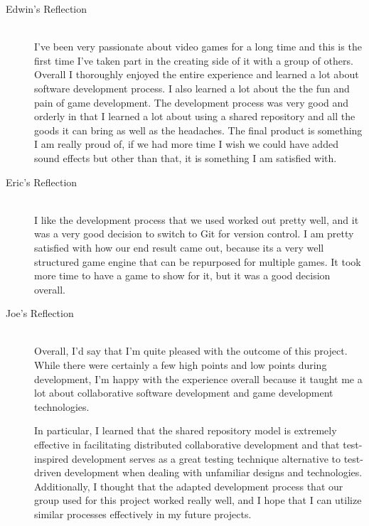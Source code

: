 \documentclass{article}
\begin{document}
\begin{description}
			\item[Edwin's Reflection] \hfill \\
			I've been very passionate about video games for a long time and this 
			is the first time I've taken part in the creating side of it with a group of
			others. Overall I thoroughly enjoyed the entire experience and learned a lot
			about software development process. I also learned a lot about the the fun
			and pain of game development. The development process was very good
			and orderly in that I learned a lot about using a shared repository and all the
			goods it can bring as well as the headaches. The final product is something
			I am really proud of, if we had more time I wish we could have added 
			sound effects but other than that, it is something I am satisfied with.

			\item[Eric's Reflection] \hfill \\
			I like the development process that we used worked out pretty well,
			and it was a very good decision to switch to Git for version control. I
			am pretty satisfied with how our end result came out, because its 
			a very well structured game engine that can be repurposed for multiple
			games. It took more time to have a game to show for it, but it was a 
			good decision overall.

			\item[Joe's Reflection] \hfill \\
			Overall, I'd say that I'm quite pleased with the outcome of this
			project.  While there were certainly a few high points and low points
			during development, I'm happy with the experience overall because it
			taught me a lot about collaborative software development and game 
			development technologies.  
			
			In particular, I learned that the shared repository model is extremely 
			effective in facilitating distributed collaborative development and 
			that test-inspired development serves as a great testing technique 
			alternative to test-driven development when dealing with unfamiliar 
			designs and technologies.  Additionally, I thought that the adapted 
			development process that our group used for this project worked really 
			well, and I hope that I can utilize similar processes effectively 
			in my future projects.  		
	\end{description}
\end{document}
